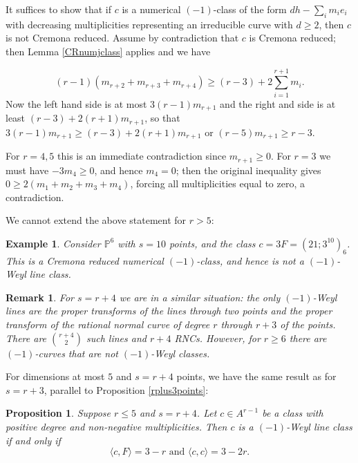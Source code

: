 \documentclass[12pt]{article}
\newtheorem{proposition}[equation]{Proposition}
\newtheorem{remark}[equation]{Remark}
\newtheorem{example}[equation]{Example}
\numberwithin{equation}{section}
\numberwithin{subeq}{equation}
\def\bbP{\mathbb{P}}
\begin{document}
\medskip{}
It suffices to show that if $c$ is a numerical $(-1)$-class
of the form $d h- \sum_i m_i e_i $ with decreasing multiplicities
representing an irreducible curve
with $d \geq 2$, then $c$ is not Cremona reduced.
Assume by contradiction that $c$ is Cremona reduced;
then Lemma \ref{CRnumjclass} applies and we have

\[
(r-1)(m_{r+2}+m_{r+3}+m_{r+4}) \geq (r-3) + 2\sum_{i=1}^{r+1}m_i.
\]
Now the left hand side is at most $3(r-1)m_{r+1}$
and the right and side is at least $(r-3)+2(r+1)m_{r+1}$, so that
$
3(r-1)m_{r+1} \geq (r-3)+2(r+1)m_{r+1}
$
or $(r-5)m_{r+1} \geq r-3$.

For $r=4,5$ this is an immediate contradiction since $m_{r+1} \geq 0$.
For $r=3$ we must have $-3m_4\geq 0$, and hence $m_4=0$;
then the original inequality
gives $0 \geq 2(m_1+m_2+m_3+m_4)$, forcing all multiplicities equal to zero,
a contradiction.


We cannot extend the above statement for $r > 5$:

\begin{example}\label{counterex} 
Consider $\bbP^6$ with $s=10$ points, and the class $c=3F=(21;3^{10})_6$.
This is a Cremona reduced numerical $(-1)$-class, and hence is not a $(-1)$-Weyl line class.
\end{example}

\begin{remark}
For $s=r+4$ we are in a similar situation:
the only $(-1)$-Weyl lines are the proper transforms of the lines through two points
and the proper transform of the rational normal curve of degree $r$ through $r+3$ of the points.
There are $r+4 \choose 2$ such lines and $r+4$ RNCs.
However, for $r\geq 6$ there are $(-1)$-curves that are not $(-1)$-Weyl classes.
\end{remark}

For dimensions at most $5$ and $s=r+4$ points, we have the same result as for $s=r+3$,
parallel to Proposition \ref{rplus3points}:

\begin{proposition}\label{rplus4points}
Suppose $r\leq 5$ and $s = r+4$.
Let $c \in A^{r-1}$ be a class with positive degree and non-negative multiplicities.
Then $c$ is a $(-1)$-Weyl line class if and only if
\[
\langle c, F \rangle = 3-r \text{ and } \langle c,c \rangle = 3-2r.
\]
\end{proposition}
\end{document}
